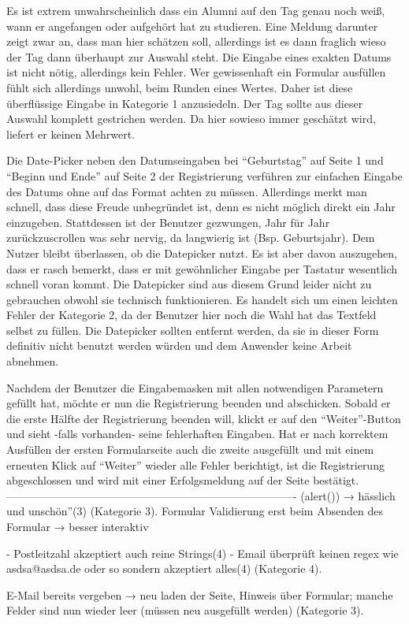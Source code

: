 {Es ist extrem unwahrscheinlich dass ein Alumni auf den Tag genau noch weiß, wann er angefangen oder aufgehört hat zu studieren. 
Eine Meldung darunter zeigt zwar an, dass man hier schätzen soll, allerdings ist es dann fraglich wieso der Tag dann überhaupt zur Auswahl steht.
}
{Die Eingabe eines exakten Datums ist nicht nötig, allerdings kein Fehler. Wer gewissenhaft ein Formular ausfüllen fühlt sich allerdings unwohl, beim Runden eines
Wertes. Daher ist diese überflüssige Eingabe in Kategorie 1 anzusiedeln.
}
{Der Tag sollte aus dieser Auswahl komplett gestrichen werden. Da hier sowieso immer geschätzt wird, liefert er keinen Mehrwert.
} 

{
Die Date-Picker neben den Datumseingaben bei “Geburtstag” auf Seite 1 und “Beginn und Ende” auf Seite 2 der Registrierung verführen zur einfachen Eingabe des Datums ohne auf das Format achten zu müssen. Allerdings merkt man schnell, dass diese Freude unbegründet ist, denn es nicht möglich direkt ein Jahr einzugeben. Stattdessen ist der Benutzer gezwungen, Jahr für Jahr zurückzuscrollen was sehr nervig, da langwierig ist (Bsp. Geburtsjahr).
}
{Dem Nutzer bleibt überlassen, ob die Datepicker nutzt. Es ist aber davon auszugehen, dass er rasch bemerkt, dass er mit gewöhnlicher Eingabe per Tastatur wesentlich schnell voran kommt. Die Datepicker sind aus diesem Grund leider nicht zu gebrauchen obwohl sie technisch funktionieren. Es handelt sich um einen leichten Fehler der Kategorie 2, da der Benutzer hier noch die Wahl hat das Textfeld selbst zu füllen.
}
{Die Datepicker sollten entfernt werden, da sie in dieser Form definitiv nicht benutzt werden würden und dem Anwender keine Arbeit abnehmen.
}





Nachdem der Benutzer die Eingabemasken mit allen notwendigen Parametern gefüllt hat, möchte er nun die Registrierung beenden und abschicken. Sobald
er die erste Hälfte der Registrierung beenden will, klickt er auf den “Weiter”-Button und sieht -falls vorhanden- seine fehlerhaften Eingaben. Hat er nach korrektem
Ausfüllen der ersten Formularseite auch die zweite ausgefüllt und mit einem erneuten Klick auf “Weiter” wieder alle Fehler berichtigt, ist die Registrierung abgeschlossen
und wird mit einer Erfolgsmeldung auf der Seite bestätigt.
-------------------------------------------------------------------------------
{
(alert()) → hässlich und unschön”(3)
}
{  (Kategorie 3).
}
{
Formular Validierung erst beim Absenden des Formular → besser interaktiv
}

{
	- Postleitzahl akzeptiert auch reine Strings(4)
	- Email überprüft keinen regex wie asdsa@asdsa.de oder so sondern akzeptiert alles(4)
}
{  (Kategorie 4).}
{
} 

{
E-Mail bereits vergeben → neu laden der Seite, Hinweis über Formular; manche Felder sind nun wieder leer (müssen neu ausgefüllt werden)
}
{  (Kategorie 3).
}
{
}  
